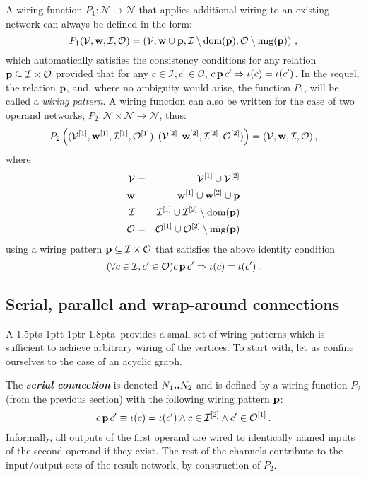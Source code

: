 \documentclass[11pt]{report}
\def\ak{{\textsf{A\kern-1.5pts\kern-1ptt\kern-1ptr\kern-1.8pta}}\kern-2pt{\it K\kern-2ptahn}}
\begin{document}
A wiring function $P_1: \mathcal{N}\to\mathcal{N} $ that applies additional wiring to an existing network can
always be defined in the form: \[
P_1 (\mathcal{V}, \hbox{\bf w}, \mathcal{I}, \mathcal{O}) = \left(\mathcal{V}, \hbox{\bf w}\cup \hbox{\bf p},
\mathcal{I}\setminus\hbox{dom}(\hbox{\bf p}), \mathcal{O}\setminus\hbox{img}(\hbox{\bf p})\right)\,,
\]
which automatically satisfies the consistency conditions for any relation $\hbox{\bf p}\subseteq \mathcal{I}\times \mathcal{O}$
provided that for any $c\in \mathcal{I}, c^\prime \in \mathcal{O}$, $c\,\hbox{\bf p}\, c^\prime \Rightarrow \iota(c)=\iota(c^\prime)$.
In the sequel, the relation $\hbox{\bf p}$, and, where no ambiguity would arise, the function $P_1$, will be called a {\em wiring
pattern}.  A wiring function can also be written for the case of two operand networks,
$P_2: \mathcal{N}\times\mathcal{N}\to\mathcal{N}$, thus:
\[
P_2 \left( (\mathcal{V}^{[1]}, \hbox{\bf w}^{[1]}, \mathcal{I}^{[1]}, \mathcal{O}^{[1]}),
(\mathcal{V}^{[2]}, \hbox{\bf w}^{[2]}, \mathcal{I}^{[2]}, \mathcal{O}^{[2]})\right) =
(\mathcal{V}, \hbox{\bf w}, \mathcal{I}, \mathcal{O})\,,
\]
where
\begin{eqnarray*}
\mathcal{V} &=& \mathcal{V}^{[1]}\cup\mathcal{V}^{[2]}\\
\hbox{\bf w} &=& \hbox{\bf w}^{[1]} \cup \hbox{\bf w}^{[2]}
										\cup \hbox{\bf p} \nonumber\\
\mathcal{I} &=& \mathcal{I}^{[1]}\cup\mathcal{I}^{[2]}\setminus\hbox{dom}(\hbox{\bf p})\nonumber\\
\mathcal{O} &=& \mathcal{O}^{[1]}\cup\mathcal{O}^{[2]}\setminus\hbox{img}(\hbox{\bf p})\nonumber\\
\end{eqnarray*}
using a wiring pattern $\hbox{\bf p}\subseteq \mathcal{I}\times \mathcal{O}$ that satisfies the above identity condition
\[(\forall c\in \mathcal{I}, c^\prime \in \mathcal{O}) c\,\hbox{\bf p}\, c^\prime \Rightarrow \iota(c)=\iota(c^\prime)\,.\]

\subsection{Serial, parallel and wrap-around connections\label{sec:series}}

\ak\ provides a small set of wiring patterns which is sufficient to achieve arbitrary wiring of the vertices. To start with,
let us confine ourselves to the case of an acyclic graph.

The \textbf{\emph{ serial connection}} is denoted $N_1\hbox{\bf ..}N_2$ and is defined by a wiring function $P_2$ (from the previous section)
with the following wiring pattern ${\bf p}$:
\[
c\,\hbox{\bf p}\,c^\prime \equiv \iota(c)=\iota(c^\prime) \wedge c\in\mathcal{I}^{[2]}\wedge c^\prime\in \mathcal{O}^{[1]}\,.
\]
Informally, all outputs of the first operand are wired to identically named inputs of the second operand if they exist. The rest of the channels
contribute to the input/output sets of the result network, by construction of $P_2$.
\end{document}
